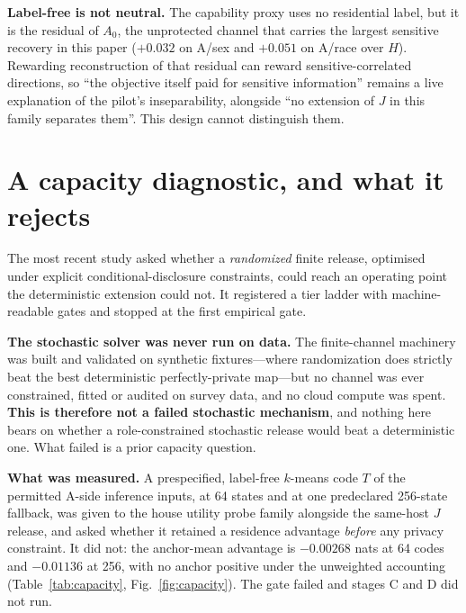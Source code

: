 \documentclass[conference]{IEEEtran}
\begin{document}
\textbf{Label-free is not neutral.} The capability proxy uses no residential label, but it is the
residual of $A_0$, the unprotected channel that carries the largest sensitive recovery in this paper
($+0.032$ on A/sex and $+0.051$ on A/race over $H$). Rewarding reconstruction of that residual can reward
sensitive-correlated directions, so ``the objective itself paid for sensitive information'' remains a
live explanation of the pilot's inseparability, alongside ``no extension of $J$ in this family separates
them''. This design cannot distinguish them.

\section{A capacity diagnostic, and what it rejects}
\label{sec:capacity}

The most recent study asked whether a \emph{randomized} finite release, optimised under explicit
conditional-disclosure constraints, could reach an operating point the deterministic extension could not.
It registered a tier ladder with machine-readable gates and stopped at the first empirical gate.

\textbf{The stochastic solver was never run on data.} The finite-channel machinery was built and
validated on synthetic fixtures---where randomization does strictly beat the best deterministic
perfectly-private map---but no channel was ever constrained, fitted or audited on survey data, and no
cloud compute was spent. \textbf{This is therefore not a failed stochastic mechanism}, and nothing here
bears on whether a role-constrained stochastic release would beat a deterministic one. What failed is a
prior capacity question.

\textbf{What was measured.} A prespecified, label-free $k$-means code $T$ of the permitted A-side
inference inputs, at 64 states and at one predeclared 256-state fallback, was given to the house utility
probe family alongside the same-host $J$ release, and asked whether it retained a residence advantage
\emph{before} any privacy constraint. It did not: the anchor-mean advantage is $-0.00268$ nats at 64
codes and $-0.01136$ at 256, with no anchor positive under the unweighted accounting
(Table~\ref{tab:capacity}, Fig.~\ref{fig:capacity}). The gate failed and stages C and D did not run.

\begin{table}[t]
\centering\footnotesize

\caption{Capacity diagnostic, development pools, validation split: residence advantage of
$[H_A,Z_J,\mathrm{onehot}(T)]$ over same-host $J$, per anchor and weighting, with the paired
household-bootstrap standard error. At $|T|=64$ every estimate lies within about one SE of zero: no
demonstrated advantage, and no demonstrated deficit.}
\label{tab:capacity}
\end{table}
\end{document}
